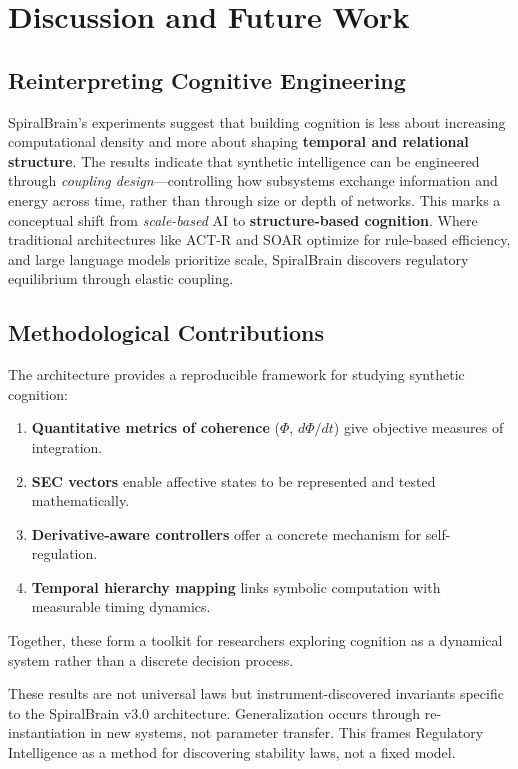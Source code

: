 \documentclass[11pt,a4paper]{article}
\begin{document}
\section{Discussion and Future Work}
\label{sec:discussion}

\subsection{Reinterpreting Cognitive Engineering}

SpiralBrain's experiments suggest that building cognition is less about increasing computational density and more about shaping \textbf{temporal and relational structure}.
The results indicate that synthetic intelligence can be engineered through \textit{coupling design}---controlling how subsystems exchange information and energy across time, rather than through size or depth of networks.
This marks a conceptual shift from \textit{scale-based} AI to \textbf{structure-based cognition}. Where traditional architectures like ACT-R and SOAR optimize for rule-based efficiency, and large language models prioritize scale, SpiralBrain discovers regulatory equilibrium through elastic coupling.

\subsection{Methodological Contributions}

The architecture provides a reproducible framework for studying synthetic cognition:

\begin{enumerate}
\item \textbf{Quantitative metrics of coherence} ($\Phi$, $d\Phi/dt$) give objective measures of integration.
\item \textbf{SEC vectors} enable affective states to be represented and tested mathematically.
\item \textbf{Derivative-aware controllers} offer a concrete mechanism for self-regulation.
\item \textbf{Temporal hierarchy mapping} links symbolic computation with measurable timing dynamics.
\end{enumerate}

Together, these form a toolkit for researchers exploring cognition as a dynamical system rather than a discrete decision process.

These results are not universal laws but instrument-discovered invariants specific to the SpiralBrain v3.0 architecture. Generalization occurs through re-instantiation in new systems, not parameter transfer. This frames Regulatory Intelligence as a method for discovering stability laws, not a fixed model.
\end{document}

